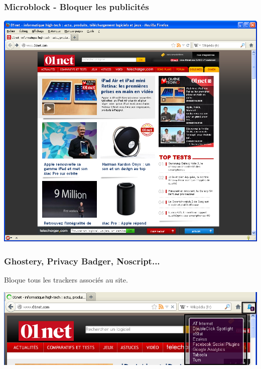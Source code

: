 \documentclass{beamer}
\begin{document}
\begin{frame}
\frametitle{Microblock - Bloquer les publicités}
\begin{center}
\includegraphics[scale=0.4] {./images/Adblock02.png}
\end{center}
\end{frame}

\begin{frame}
\frametitle{Ghostery, Privacy Badger, Noscript...}
Bloque tous les trackers associés au site.
\begin{center}
\includegraphics[scale=0.4] {./images/Ghostery_tracker.png}
\end{center}
\end{frame}
\end{document}
